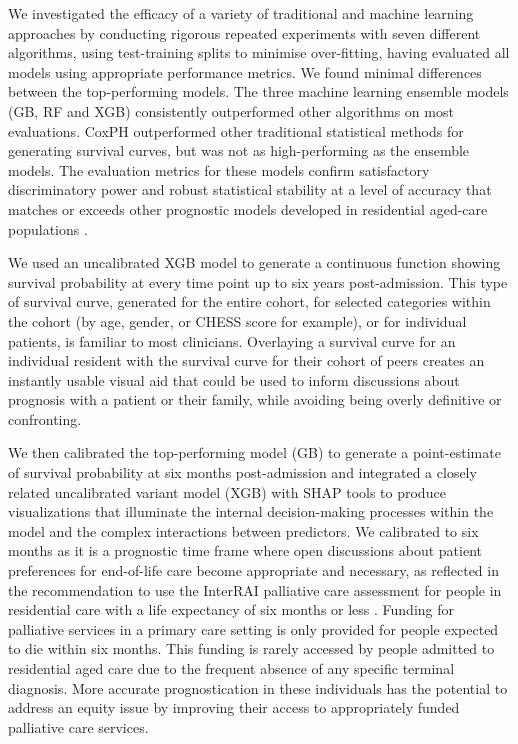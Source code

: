 \documentclass{article}
\begin{document}
We investigated the efficacy of a variety of traditional and machine learning approaches by conducting rigorous repeated experiments with seven different algorithms, using test-training splits to minimise over-fitting, having evaluated all models using appropriate performance metrics. We found minimal differences between the top-performing models. The three machine learning ensemble models (GB, RF and XGB) consistently outperformed other algorithms on most evaluations. CoxPH outperformed other traditional statistical methods for generating survival curves, but was not as high-performing as the ensemble models.  The evaluation metrics for these models confirm satisfactory discriminatory power and robust statistical stability at a level of accuracy that matches or exceeds other prognostic models developed in residential aged-care populations \cite{kruse2010using, van2007prediction, zhang2023prediction}.

We used an uncalibrated XGB model to generate a continuous function showing survival probability at every time point up to six years post-admission.  This type of survival curve, generated for the entire cohort,  for selected categories within the cohort (by age, gender,  or CHESS score for example), or for individual patients, is familiar to most clinicians.  Overlaying a survival curve for an individual resident with the survival curve for their cohort of peers creates an instantly usable visual aid that could be used to inform discussions about prognosis with a patient or their family, while avoiding being overly definitive or confronting.

We then calibrated the top-performing model (GB) to generate  a point-estimate of survival probability at six months post-admission and integrated a closely related uncalibrated variant model (XGB) with SHAP tools to produce visualizations that illuminate the internal decision-making processes within the model and the complex interactions between predictors.  We calibrated to six months as it is a prognostic time frame where open discussions about patient preferences for end-of-life care become appropriate and necessary, as reflected in the recommendation to use the InterRAI palliative care assessment for people in residential care with a life expectancy of six months or less \cite{interrai2023palliative}. Funding for palliative services in a primary care setting is only provided for people expected to die within six months. This funding is rarely accessed by people admitted to residential aged care due to the frequent absence of any specific terminal diagnosis.  More accurate prognostication in these individuals has the potential to address an equity issue by improving their access to appropriately funded palliative care services.
\end{document}
